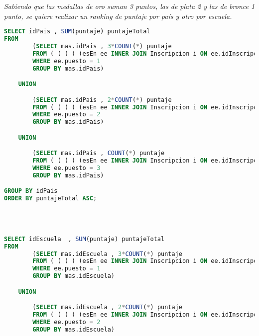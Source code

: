 \emph{Sabiendo que las medallas de oro suman 3 puntos, las de plata 2 y las de bronce 1 punto, se quiere realizar un ranking de puntaje por país y otro por escuela.}
\begin{lstlisting}[language=SQL]
SELECT idPais , SUM(puntaje) puntajeTotal
FROM
		(SELECT	mas.idPais , 3*COUNT(*) puntaje 
		FROM ( ( ( ( (esEn ee INNER JOIN Inscripcion i ON ee.idInscripcion = i.idInscripcion) INNER JOIN  esIntegranteDe eid ON eid.idInscripcion = i.idInscripcion ) INNER JOIN Estudiante e ON e.numCertificado = eid.numCertificado) INNER JOIN Escuela esc ON e.idEscuela = esc.idEscuela) INNER JOIN Mestro mas ON esc.idMaestro = mas.placaInstructor) 
		WHERE ee.puesto = 1
		GROUP BY mas.idPais)

	UNION

		(SELECT	mas.idPais , 2*COUNT(*) puntaje 
		FROM ( ( ( ( (esEn ee INNER JOIN Inscripcion i ON ee.idInscripcion = i.idInscripcion) INNER JOIN  esIntegranteDe eid ON eid.idInscripcion = i.idInscripcion ) INNER JOIN Estudiante e ON e.numCertificado = eid.numCertificado) INNER JOIN Escuela esc ON e.idEscuela = esc.idEscuela) INNER JOIN Mestro mas ON esc.idMaestro = mas.placaInstructor) 
		WHERE ee.puesto = 2
		GROUP BY mas.idPais)

	UNION

		(SELECT	mas.idPais , COUNT(*) puntaje 
		FROM ( ( ( ( (esEn ee INNER JOIN Inscripcion i ON ee.idInscripcion = i.idInscripcion) INNER JOIN  esIntegranteDe eid ON eid.idInscripcion = i.idInscripcion ) INNER JOIN Estudiante e ON e.numCertificado = eid.numCertificado) INNER JOIN Escuela esc ON e.idEscuela = esc.idEscuela) INNER JOIN Mestro mas ON esc.idMaestro = mas.placaInstructor) 
		WHERE ee.puesto = 3
		GROUP BY mas.idPais)

GROUP BY idPais
ORDER BY puntajeTotal ASC;




SELECT idEscuela  , SUM(puntaje) puntajeTotal
FROM
		(SELECT	mas.idEscuela , 3*COUNT(*) puntaje 
		FROM ( ( ( ( (esEn ee INNER JOIN Inscripcion i ON ee.idInscripcion = i.idInscripcion) INNER JOIN  esIntegranteDe eid ON eid.idInscripcion = i.idInscripcion ) INNER JOIN Estudiante e ON e.numCertificado = eid.numCertificado) INNER JOIN Escuela esc ON e.idEscuela = esc.idEscuela) INNER JOIN Mestro mas ON esc.idMaestro = mas.placaInstructor) 
		WHERE ee.puesto = 1
		GROUP BY mas.idEscuela)

	UNION

		(SELECT	mas.idEscuela , 2*COUNT(*) puntaje 
		FROM ( ( ( ( (esEn ee INNER JOIN Inscripcion i ON ee.idInscripcion = i.idInscripcion) INNER JOIN  esIntegranteDe eid ON eid.idInscripcion = i.idInscripcion ) INNER JOIN Estudiante e ON e.numCertificado = eid.numCertificado) INNER JOIN Escuela esc ON e.idEscuela = esc.idEscuela) INNER JOIN Mestro mas ON esc.idMaestro = mas.placaInstructor) 
		WHERE ee.puesto = 2
		GROUP BY mas.idEscuela)


\end{lstlisting}
